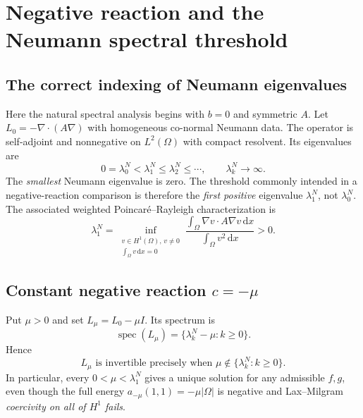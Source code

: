 \documentclass[11pt,letterpaper]{article}
\newcommand{\Om}{\Omega}
\newcommand{\dd}{\,\mathrm d}
\newcommand{\spec}{\operatorname{spec}}
\begin{document}
\section{Negative reaction and the Neumann spectral threshold}
\subsection{The correct indexing of Neumann eigenvalues}
Here the natural spectral analysis begins with $b=0$ and symmetric $A$.
Let $L_0=-\nabla\cdot(A\nabla)$ with homogeneous co-normal Neumann data.
The operator is self-adjoint and nonnegative on $L^2(\Om)$ with compact
resolvent. Its eigenvalues are
\begin{equation}\label{eq:spectrum}
 \boxed{0=\lambda_0^N<\lambda_1^N\le\lambda_2^N\le\cdots,
 \qquad\lambda_k^N\to\infty.}
\end{equation}
The \emph{smallest} Neumann eigenvalue is zero. The threshold commonly
intended in a negative-reaction comparison is therefore the \emph{first
positive} eigenvalue $\lambda_1^N$, not $\lambda_0^N$.
The associated weighted Poincar\'e--Rayleigh characterization is
\begin{equation}\label{eq:rayleigh}
 \lambda_1^N
 =\inf_{\substack{v\in H^1(\Om),\,v\ne0\\\int_\Om v\dd x=0}}
 \frac{\int_\Om \nabla v\cdot A\nabla v\dd x}
      {\int_\Om v^2\dd x}>0.
\end{equation}

\subsection{Constant negative reaction $c=-\mu$}
Put $\mu>0$ and set $L_\mu=L_0-\mu I$. Its spectrum is
\begin{equation}\label{eq:shiftedspec}
 \spec(L_\mu)=\{\lambda_k^N-\mu:k\ge0\}.
\end{equation}
Hence
\begin{equation}\label{eq:resonancecriterion}
 \boxed{L_\mu\text{ is invertible precisely when }
              \mu\notin\{\lambda_k^N:k\ge0\}.}
\end{equation}
In particular, every $0<\mu<\lambda_1^N$ gives a unique solution for any
admissible $f,g$, even though the full energy
$a_{-\mu}(1,1)=-\mu|\Om|$ is negative and Lax--Milgram \emph{coercivity on
all of $H^1$ fails}.
\end{document}
